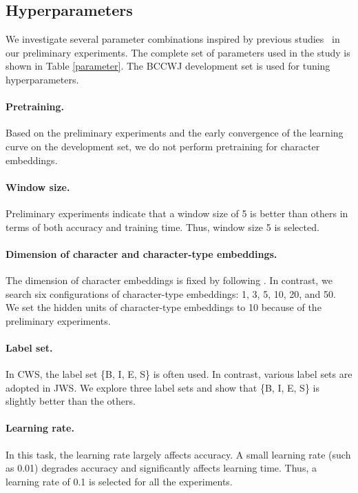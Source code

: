 \documentclass[11pt]{article}
\begin{document}
\subsection{Hyperparameters}
We investigate several parameter combinations inspired by previous
studies~\cite{chen-EtAl:2015:EMNLP2} in our preliminary experiments. The
complete set of parameters used in the study is shown in Table
\ref{parameter}. The BCCWJ development set is used for tuning hyperparameters.

\paragraph{Pretraining.}
Based on the preliminary experiments and the early convergence of the learning
curve on the development set, we do not perform pretraining for character
embeddings.

\paragraph{Window size.} Preliminary experiments indicate that a window size
of 5 is better than others in terms of both accuracy and training time.
Thus, window size 5 is selected.

\paragraph{Dimension of character and character-type embeddings.}
The dimension of character embeddings is fixed by following \cite{chen-EtAl:2015:EMNLP2}.
In contrast, we search six configurations of character-type embeddings: 1, 3,
5, 10, 20, and 50. We set the hidden units of character-type embeddings to 10
because of the preliminary experiments.

\paragraph{Label set.}  In CWS, the label set \{B, I, E, S\} is often used. In
contrast, various label sets are adopted in JWS. We explore three label sets
and show that \{B, I, E, S\} is slightly better than the others.

\paragraph{Learning rate.} In this task, the learning rate largely affects
accuracy. A small learning rate (such as 0.01) degrades accuracy and
significantly affects learning time. Thus, a learning rate of 0.1 is
selected for all the experiments.
\end{document}
